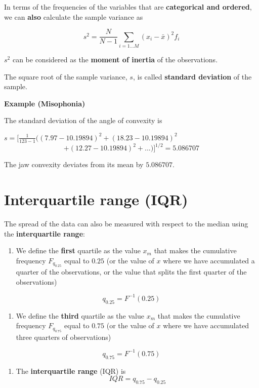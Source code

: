 \documentclass[
]{book}
\providecommand{\tightlist}{%
  \setlength{\itemsep}{0pt}\setlength{\parskip}{0pt}}
\begin{document}
In terms of the frequencies of the variables that are \textbf{categorical and ordered}, we can \textbf{also} calculate the sample variance as

\[s^2=\frac{N}{N-1} \sum_{i=1... M} (x_i -\bar{x})^2 f_i\]

\(s^2\) can be considered as the \textbf{moment of inertia} of the observations.

The square root of the sample variance, \(s\), is called \textbf{standard deviation} of the sample.

\textbf{Example (Misophonia)}

The standard deviation of the angle of convexity is

\(s= [\frac{ 1}{123-1}((7.97-10.19894)^2+ (18.23-10.19894)^2\)
\[+ (12.27-10.19894 )^ 2 + ...)]^{1/2} = 5.086707\]

The jaw convexity deviates from its mean by \(5.086707\).

\hypertarget{interquartile-range-iqr}{%
\section{Interquartile range (IQR)}\label{interquartile-range-iqr}}

The spread of the data can also be measured with respect to the median using the \textbf{interquartile range}:

\begin{enumerate}
\def\labelenumi{\arabic{enumi})}
\tightlist
\item
  We define the \textbf{first} quartile as the value \(x_m\) that makes the cumulative frequency \(F_{q_{0.25}}\) equal to \(0.25\) (or the value of \(x\) where we have accumulated a quarter of the observations, or the value that splits the first quarter of the observations)
\end{enumerate}

\[q_{0.25}=F^{-1}(0.25)\]

\begin{enumerate}
\def\labelenumi{\arabic{enumi})}
\setcounter{enumi}{1}
\tightlist
\item
  We define the \textbf{third} quartile as the value \(x_m\) that makes the cumulative frequency \(F_{q_{0.75}}\) equal to \(0.75\) (or the value of \(x\) where we have accumulated three quarters of observations)
\end{enumerate}

\[q_{0.75}=F^{-1}(0.75)\]

\begin{enumerate}
\def\labelenumi{\arabic{enumi})}
\setcounter{enumi}{2}
\tightlist
\item
  The \textbf{interquartile range} (IQR) is \[IQR=q_{0.75} - q_{0.25}\]
\end{enumerate}
\end{document}
